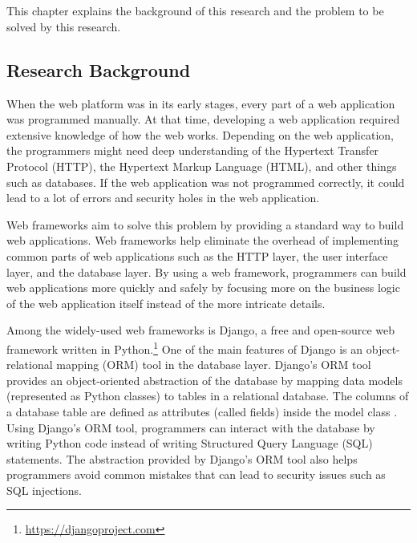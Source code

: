 \chapter{\babSatu}

This chapter explains the background of this research and the problem to be
solved by this research.

\section{Research Background}

When the web platform was in its early stages, every part of a web application
was programmed manually. At that time, developing a web application required
extensive knowledge of how the web works. Depending on the web application, the
programmers might need deep understanding of the Hypertext Transfer Protocol
(HTTP), the Hypertext Markup Language (HTML), and other things such as
databases. If the web application was not programmed correctly, it could lead
to a lot of errors and security holes in the web application.

Web frameworks aim to solve this problem by providing a standard way to build
web applications. Web frameworks help eliminate the overhead of implementing
common parts of web applications such as the HTTP layer, the user interface
layer, and the database layer. By using a web framework, programmers can build
web applications more quickly and safely by focusing more on the business logic
of the web application itself instead of the more intricate details.

Among the widely-used web frameworks is Django, a free and open-source web
framework written in Python.\footnote{\url{https://djangoproject.com}} One of
the main features of Django is an object-relational mapping (ORM) tool in the
database layer. Django's ORM tool provides an object-oriented abstraction of
the database by mapping data models (represented as Python classes) to tables
in a relational database. The columns of a database table are defined as
attributes (called fields) inside the model class \cite{django}. Using Django's
ORM tool, programmers can interact with the database by writing Python code
instead of writing Structured Query Language (SQL) statements. The abstraction
provided by Django's ORM tool also helps programmers avoid common mistakes that
can lead to security issues such as SQL injections.

